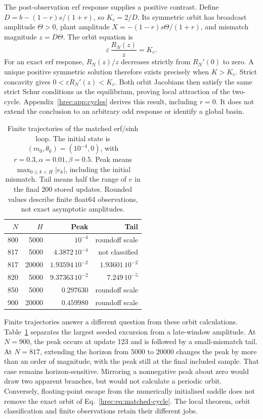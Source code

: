 The post-observation erf response supplies a positive contrast. Define \(D=b-(1-r)s/(1+r)\), so \(K_c=2/D\). Its symmetric orbit has broadcast amplitude \(\Theta>0\), plant amplitude \(X=-(1-r)s\Theta/(1+r)\), and mismatch magnitude \(z=D\Theta\). The orbit equation is
\begin{equation}
 \varepsilon\,\frac{R_N(z)}{z}=K_c.
 \label{hrec:eq:post-cycle}
\end{equation}
For an exact erf response, \(R_N(z)/z\) decreases strictly from \(R_N'(0)\) to zero. A unique positive symmetric solution therefore exists precisely when \(K>K_c\). Strict concavity gives \(0<\varepsilon R_N'(z)<K_c\). Both orbit Jacobians then satisfy the same strict Schur conditions as the equilibrium, proving local attraction of the two-cycle. Appendix~\ref{hrec:app:cycles} derives this result, including \(r=0\). It does not extend the conclusion to an arbitrary odd response or identify a global basin.

\begin{table}[t]
 \centering
 \caption{Finite trajectories of the matched erf/sinh loop. The initial state is \((m_0,\theta_0)=(10^{-4},0)\), with \(r=0.3,\alpha=0.01,\beta=0.5\). Peak means \(\max_{0\le k<H}|e_k|\), including the initial mismatch. Tail means half the range of \(e\) in the final 200 stored updates. Rounded values describe finite float64 observations, not exact asymptotic amplitudes.}
 \label{hrec:tab:transients}
 \begin{tabular}{rrrr}
 \toprule
 \(N\)&\(H\)&Peak&Tail\\
 \midrule
 800&5000&\(10^{-4}\)&roundoff scale\\
 817&5000&\(4.3872\,10^{-4}\)&not classified\\
 817&20000&\(1.93594\,10^{-2}\)&\(1.93601\,10^{-2}\)\\
 820&5000&\(9.37363\,10^{-2}\)&\(7.249\,10^{-5}\)\\
 850&5000&\(0.297630\)&roundoff scale\\
 900&20000&\(0.459980\)&roundoff scale\\
 \bottomrule
 \end{tabular}
\end{table}

Finite trajectories answer a different question from these orbit calculations. Table~\ref{hrec:tab:transients} separates the largest seeded excursion from a late-window amplitude. At \(N=900\), the peak occurs at update 123 and is followed by a small-mismatch tail. At \(N=817\), extending the horizon from 5000 to 20000 changes the peak by more than an order of magnitude, with the peak still at the final included sample. That case remains horizon-sensitive. Mirroring a nonnegative peak about zero would draw two apparent branches, but would not calculate a periodic orbit. Conversely, floating-point escape from the numerically initialised saddle does not remove the exact orbit of Eq.~\eqref{hrec:eq:matched-cycle}. The local theorem, orbit classification and finite observations retain their different jobs.


